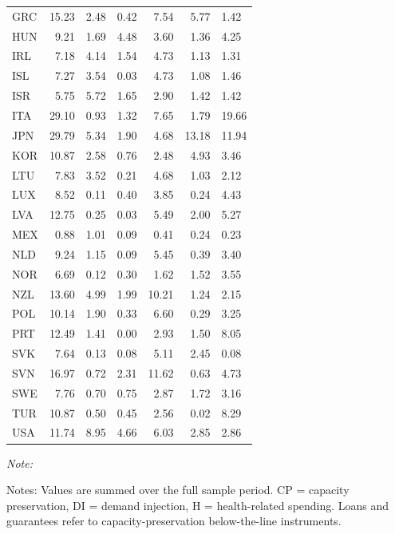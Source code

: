 \documentclass[12pt, a4paper]{article}
\begin{document}
\begin{table}[H]
{\begin{threeparttable}
\begin{tabular}[t]{lrrrrrl}
GRC & 15.23 & 2.48 & 0.42 & 7.54 & 5.77 & 1.42\\
HUN & 9.21 & 1.69 & 4.48 & 3.60 & 1.36 & 4.25\\
IRL & 7.18 & 4.14 & 1.54 & 4.73 & 1.13 & 1.31\\
ISL & 7.27 & 3.54 & 0.03 & 4.73 & 1.08 & 1.46\\
\addlinespace
ISR & 5.75 & 5.72 & 1.65 & 2.90 & 1.42 & 1.42\\
ITA & 29.10 & 0.93 & 1.32 & 7.65 & 1.79 & 19.66\\
JPN & 29.79 & 5.34 & 1.90 & 4.68 & 13.18 & 11.94\\
KOR & 10.87 & 2.58 & 0.76 & 2.48 & 4.93 & 3.46\\
LTU & 7.83 & 3.52 & 0.21 & 4.68 & 1.03 & 2.12\\
\addlinespace
LUX & 8.52 & 0.11 & 0.40 & 3.85 & 0.24 & 4.43\\
LVA & 12.75 & 0.25 & 0.03 & 5.49 & 2.00 & 5.27\\
MEX & 0.88 & 1.01 & 0.09 & 0.41 & 0.24 & 0.23\\
NLD & 9.24 & 1.15 & 0.09 & 5.45 & 0.39 & 3.40\\
NOR & 6.69 & 0.12 & 0.30 & 1.62 & 1.52 & 3.55\\
\addlinespace
NZL & 13.60 & 4.99 & 1.99 & 10.21 & 1.24 & 2.15\\
POL & 10.14 & 1.90 & 0.33 & 6.60 & 0.29 & 3.25\\
PRT & 12.49 & 1.41 & 0.00 & 2.93 & 1.50 & 8.05\\
SVK & 7.64 & 0.13 & 0.08 & 5.11 & 2.45 & 0.08\\
SVN & 16.97 & 0.72 & 2.31 & 11.62 & 0.63 & 4.73\\
\addlinespace
SWE & 7.76 & 0.70 & 0.75 & 2.87 & 1.72 & 3.16\\
TUR & 10.87 & 0.50 & 0.45 & 2.56 & 0.02 & 8.29\\
USA & 11.74 & 8.95 & 4.66 & 6.03 & 2.85 & 2.86\\
\bottomrule
\end{tabular}
\begin{tablenotes}
\item \textit{Note: } 
\item Notes: Values are summed over the full sample period. CP = capacity preservation, DI = demand injection, H = health-related spending. Loans and guarantees refer to capacity-preservation below-the-line instruments.
\end{tablenotes}
\end{threeparttable}}
\end{table}
\end{document}
